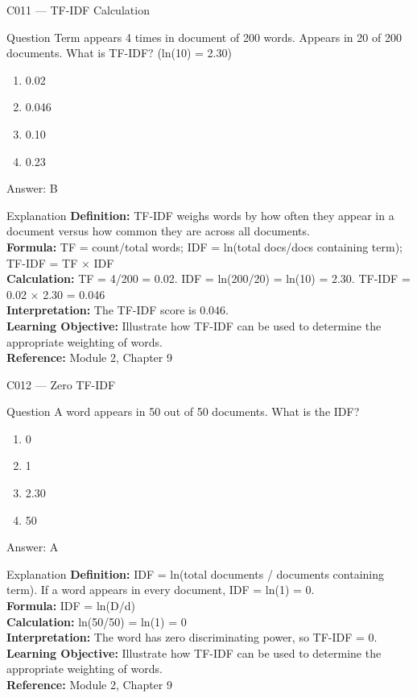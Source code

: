 \documentclass[aspectratio=169,8pt]{beamer}
\begin{document}
	\begin{frame}{C011 --- TF-IDF Calculation}
		\begin{block}{Question}
			Term appears 4 times in document of 200 words. Appears in 20 of 200 documents. What is TF-IDF? (ln(10) = 2.30)
			\begin{enumerate}
				\item 0.02
				\item 0.046
				\item 0.10
				\item 0.23
			\end{enumerate}
		\end{block}
		\begin{exampleblock}{Answer: B}\end{exampleblock}
		\begin{block}{Explanation}
			\textbf{Definition:} TF-IDF weighs words by how often they appear in a document versus how common they are across all documents.\\
			\textbf{Formula:} TF = count/total words; IDF = ln(total docs/docs containing term); TF-IDF = TF $\times$ IDF\\
			\textbf{Calculation:} TF = 4/200 = 0.02. IDF = ln(200/20) = ln(10) = 2.30. TF-IDF = 0.02 $\times$ 2.30 = 0.046\\
			\textbf{Interpretation:} The TF-IDF score is 0.046.\\
			\textbf{Learning Objective:} Illustrate how TF-IDF can be used to determine the appropriate weighting of words.\\
			\textbf{Reference:} Module 2, Chapter 9
		\end{block}
	\end{frame}
	
	\begin{frame}{C012 --- Zero TF-IDF}
		\begin{block}{Question}
			A word appears in 50 out of 50 documents. What is the IDF?
			\begin{enumerate}
				\item 0
				\item 1
				\item 2.30
				\item 50
			\end{enumerate}
		\end{block}
		\begin{exampleblock}{Answer: A}\end{exampleblock}
		\begin{block}{Explanation}
			\textbf{Definition:} IDF = ln(total documents / documents containing term). If a word appears in every document, IDF = ln(1) = 0.\\
			\textbf{Formula:} IDF = ln(D/d)\\
			\textbf{Calculation:} ln(50/50) = ln(1) = 0\\
			\textbf{Interpretation:} The word has zero discriminating power, so TF-IDF = 0.\\
			\textbf{Learning Objective:} Illustrate how TF-IDF can be used to determine the appropriate weighting of words.\\
			\textbf{Reference:} Module 2, Chapter 9
		\end{block}
	\end{frame}
	
\end{document}
